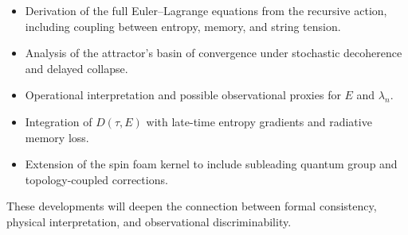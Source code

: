 \begin{itemize}
  \item Derivation of the full Euler–Lagrange equations from the recursive action, including coupling between entropy, memory, and string tension.
  \item Analysis of the attractor’s basin of convergence under stochastic decoherence and delayed collapse.
  \item Operational interpretation and possible observational proxies for \( E \) and \( \lambda_n \).
  \item Integration of \( D(\tau, E) \) with late-time entropy gradients and radiative memory loss.
  \item Extension of the spin foam kernel to include subleading quantum group and topology-coupled corrections.
\end{itemize}

These developments will deepen the connection between formal consistency, physical interpretation, and observational discriminability.
